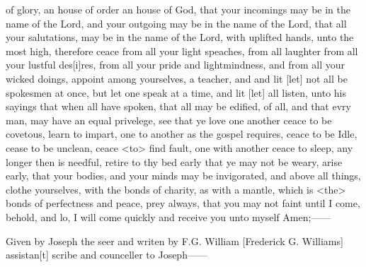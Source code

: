 of glory, an house of order an house of God, that your incomings may be in the name of the Lord, and your outgoing may be in the name of the Lord, that all your salutations, may be in the name of the Lord, with uplifted hands, unto the most high, therefore ceace from all your light speaches, from all laughter from all your lustful des[i]res, from all your pride and lightmindness, and from all your wicked doings, appoint among yourselves, a teacher, and and lit [let] not all be spokesmen at once, but let one speak at a time, and lit [let] all listen, unto his sayings that when all have spoken, that all may be edified, of all, and that evry man, may have an equal privelege, see that ye love one another ceace to be covetous, learn to impart, one to another as the gospel requires, ceace to be Idle, cease to be unclean, ceace <to> find fault, one with another ceace to sleep, any longer then is needful, retire to thy bed early that ye may not be weary, arise early, that your bodies, and your minds may be invigorated, and above all things, clothe yourselves, with the bonds of charity, as with a mantle, which is <the> bonds of perfectness and peace, prey always, that you may not faint until I come, behold, and lo, I will come quickly and receive you unto myself Amen;------
				
				Given by Joseph the seer and writen by F.G. William [Frederick G. Williams] assistan[t] scribe and counceller to  Joseph------